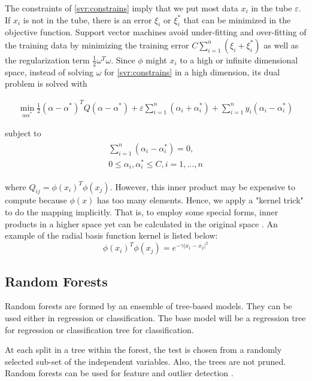 The constraints of \eqref{svr:constrains} imply that we put most data $x_i$ in the tube $\varepsilon$. If $x_i$ is not in the tube, there is an error $\xi_i$ or $\xi_i^*$ that can be minimized in the objective function. Support vector machines avoid under-fitting and over-fitting of the training data by minimizing the training error $C\sum_{i=1}^n(\xi_i+\xi_i^*)$ as well as the regularization term $\frac{1}{2}\omega^T\omega$. Since $\phi$ might $x_i$ to a high or infinite dimensional space, instead of solving $\omega$ for \eqref{svr:constrains} in a high dimension, its dual problem is solved with \cite{Shu2006,Chen2004}

\begin{align}
\min_{\alpha\alpha^*}\frac{1}{2}(\alpha-\alpha^*)^TQ(\alpha-\alpha^*)+\varepsilon\sum^n_{i=1}(\alpha_i+\alpha_i^*)+\sum_{i=1}^ny_i(\alpha_i-\alpha_i^*)
\end{align}

subject to 
\begin{align}
\begin{multlined}
\sum_{i=1}^n(\alpha_i-\alpha_i^*)=0,\\
0\leq\alpha_i,\alpha^*_i\leq C,i=1,\ldots,n
\end{multlined}
\end{align}

where $Q_{ij}=\phi(x_i)^T\phi(x_j)$. However, this inner product may be expensive to compute because $\phi(x)$ has too many elements. Hence, we apply a "kernel trick" to do the mapping implicitly. That is, to employ some special forms, inner products in a higher space yet can be calculated in the original space \cite{Shu2006}. An example of the radial basis function kernel is listed below:
\begin{equation}
\phi(x_i)^T\phi(x_j)=e^{-\gamma\left|x_1-x_2\right|^2}
\end{equation}

\subsection{Random Forests}

Random forests are formed by an ensemble of tree-based models. They can be used either in regression or classification. The base model will be a regression tree for regression or classification tree for classification. 

At each split in a tree within the forest, the test is chosen from a randomly selected sub-set of the independent variables. Also, the trees are not pruned. Random forests can be used for feature and outlier detection \cite{Herrera2010}.




